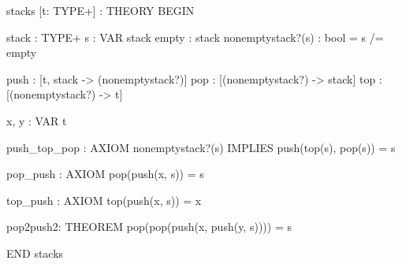 stacks [t: TYPE+] : THEORY
  BEGIN

  stack : TYPE+
  s : VAR stack
  empty : stack
  nonemptystack?(s) : bool =   s /= empty

  push : [t, stack -> (nonemptystack?)]
  pop : [(nonemptystack?) -> stack]
  top : [(nonemptystack?) -> t]

  x, y : VAR t

  push_top_pop : AXIOM
    nonemptystack?(s) IMPLIES push(top(s), pop(s)) = s

  pop_push : AXIOM pop(push(x, s)) = s

  top_push : AXIOM top(push(x, s)) = x

  pop2push2: THEOREM pop(pop(push(x, push(y, s)))) = s   

END stacks 
